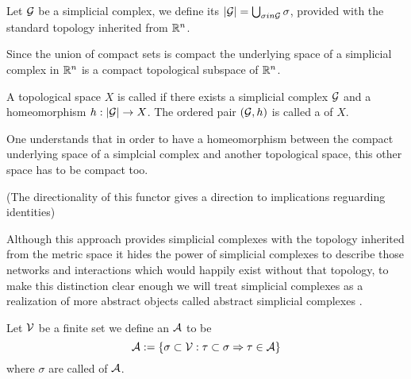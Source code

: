 \documentclass[../1.tex]{subfiles}
\begin{document}
    \begin{defn}
        Let $\mathcal{G}$ be a simplicial complex, we define its  $|\mathcal{G}| = \bigcup_{\sigma in \mathcal{G}} \sigma$, provided with
        the standard topology inherited from $\mathbb{R}^n$.
    \end{defn}

    Since the union of compact sets is compact the underlying space of a simplicial complex in $\mathbb{R}^n$ is a compact topological subspace of $\mathbb{R}^n$.

    \begin{defn}
        A topological space $X$ is called  if there exists a simplicial complex $\mathcal{G}$ and a homeomorphism
        $h : |\mathcal{G}| \to X$. The ordered pair $(\mathcal{G}, h)$ is called a  of $X$.
    \end{defn}

    One understands that in order to have a homeomorphism between the compact underlying space of a simplcial complex and another topological
    space, this other space has to be compact too.

    \begin{lem}
    \end{lem}

    \begin{defn}
    \end{defn}

    \begin{thm}
    \end{thm}

    (The directionality of this functor gives a direction to implications reguarding identities)

    Although this approach provides simplicial complexes with the topology inherited from the metric space it hides the power of simplicial complexes 
    to describe those networks and interactions which would happily exist without that topology, to make this distinction clear enough we will treat
    simplicial complexes as a realization of more abstract objects called abstract simplicial complexes \cite{rotman}.
    
    \begin{defn}
        Let $\mathcal{V}$ be a finite set we define an  $\mathcal{A}$ to be 
        \[\mathcal{A}:=\{ \sigma  \subset \mathcal{V} : \tau \subset \sigma \Rightarrow \tau \in \mathcal{A} \}\] 
        where $\sigma$ are called  of $\mathcal{A}$.
    \end{defn}
    
\end{document}
